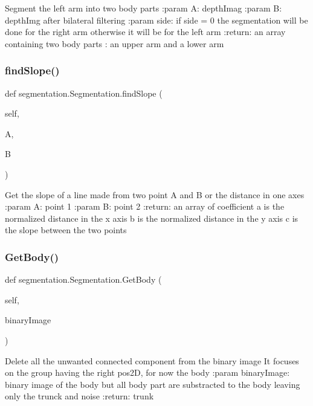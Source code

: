 \begin{DoxyVerb}Segment the left arm into two body parts
:param A: depthImag
:param B: depthImg after bilateral filtering
:param side: if side = 0 the segmentation will be done for the right arm
  otherwise it will be for the left arm
:return: an array containing two body parts : an upper arm and a lower arm
\end{DoxyVerb}
 \mbox{\label{classsegmentation_1_1_segmentation_a9ceb7a7b25953d9b693ab9f6fa1e6e3a}} 
\subsubsection{find\+Slope()}
{\footnotesize\ttfamily def segmentation.\+Segmentation.\+find\+Slope (\begin{DoxyParamCaption}\item[{}]{self,  }\item[{}]{A,  }\item[{}]{B }\end{DoxyParamCaption})}

\begin{DoxyVerb}Get the slope of a line made from two point A and B or the distance in one axes
:param A: point 1
:param B: point 2
:return: an array of coefficient
a is the normalized distance in the x axis
b is the normalized distance in the y axis
c is the slope between the two points
\end{DoxyVerb}
 \mbox{\label{classsegmentation_1_1_segmentation_a974ac6a7e245713d6f5f2b7531fe6d71}} 
\subsubsection{Get\+Body()}
{\footnotesize\ttfamily def segmentation.\+Segmentation.\+Get\+Body (\begin{DoxyParamCaption}\item[{}]{self,  }\item[{}]{binary\+Image }\end{DoxyParamCaption})}

\begin{DoxyVerb}Delete all the unwanted connected component from the binary image
It focuses on the group having the right pos2D, for now the body
:param binaryImage: binary image of the body but all body part are substracted to the body leaving only the trunck and noise
:return: trunk
\end{DoxyVerb}
 \mbox{\label{classsegmentation_1_1_segmentation_ad4a3e196437e4577129dc7c5aed2f559}} 
